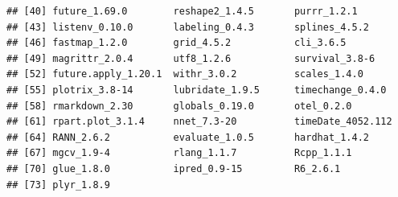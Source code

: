 \documentclass[
  11pt,
]{article}
\begin{document}
\begin{verbatim}
## [40] future_1.69.0        reshape2_1.4.5       purrr_1.2.1         
## [43] listenv_0.10.0       labeling_0.4.3       splines_4.5.2       
## [46] fastmap_1.2.0        grid_4.5.2           cli_3.6.5           
## [49] magrittr_2.0.4       utf8_1.2.6           survival_3.8-6      
## [52] future.apply_1.20.1  withr_3.0.2          scales_1.4.0        
## [55] plotrix_3.8-14       lubridate_1.9.5      timechange_0.4.0    
## [58] rmarkdown_2.30       globals_0.19.0       otel_0.2.0          
## [61] rpart.plot_3.1.4     nnet_7.3-20          timeDate_4052.112   
## [64] RANN_2.6.2           evaluate_1.0.5       hardhat_1.4.2       
## [67] mgcv_1.9-4           rlang_1.1.7          Rcpp_1.1.1          
## [70] glue_1.8.0           ipred_0.9-15         R6_2.6.1            
## [73] plyr_1.8.9
\end{verbatim}
\end{document}
